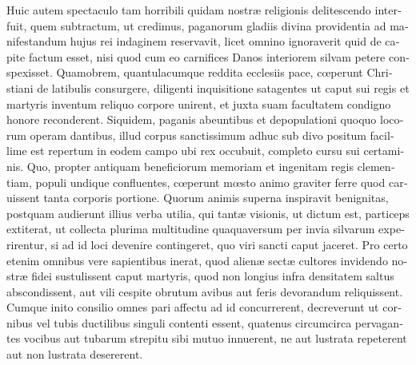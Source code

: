 \documentclass[10pt]{book}
\begin{document}
\begin{paracol}{2}
\switchcolumn*

\begin{otherlanguage}{latin}
Huic autem spectaculo tam horribili quidam nostr\ae{} religionis delitescendo interfuit, quem subtractum, ut credimus, paganorum gladiis divina providentia ad manifestandum hujus rei indaginem reservavit, licet omnino ignoraverit quid de capite factum esset, nisi quod cum eo carnifices Danos interiorem silvam petere conspexisset. Quamobrem, quantulacumque reddita ecclesiis pace, c\oe{}perunt Christiani de latibulis consurgere, diligenti inquisitione satagentes ut caput sui regis et martyris inventum reliquo corpore unirent, et juxta suam facultatem condigno honore reconderent. Siquidem, paganis abeuntibus et depopulationi quoquo locorum operam dantibus, illud corpus sanctissimum adhuc sub divo positum facillime est repertum in eodem campo ubi rex occubuit, completo cursu sui certaminis. Quo, propter antiquam beneficiorum memoriam et ingenitam regis clementiam, populi undique confluentes, c\oe{}perunt m\oe{}sto animo graviter ferre quod caruissent tanta corporis portione. Quorum animis superna inspiravit benignitas, postquam audierunt illius verba utilia, qui tant\ae{} visionis, ut dictum est, particeps extiterat, ut collecta plurima multitudine quaquaversum per invia silvarum experirentur, si ad id loci devenire contingeret, quo viri sancti caput jaceret. Pro certo etenim omnibus vere sapientibus inerat, quod alien\ae{} sect\ae{} cultores invidendo nostr\ae{} fidei sustulissent caput martyris, quod non longius infra densitatem saltus abscondissent, aut vili cespite obrutum avibus aut feris devorandum reliquissent. Cumque inito consilio omnes pari affectu ad id concurrerent, decreverunt ut cornibus vel tubis ductilibus singuli contenti essent, quatenus circumcirca pervagantes vocibus aut tubarum strepitu sibi mutuo innuerent, ne aut lustrata repeterent aut non lustrata desererent.
\end{otherlanguage}

\switchcolumn


\end{paracol}
\end{document}
